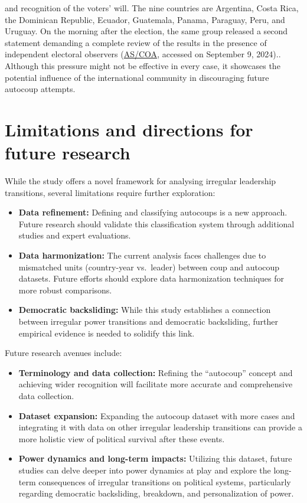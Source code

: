 \documentclass[
  12pt,
]{report}
\begin{document}
\begin{itemize}
{    and recognition of the voters' will. The nine countries are
    Argentina, Costa Rica, the Dominican Republic, Ecuador, Guatemala,
    Panama, Paraguay, Peru, and Uruguay. On the morning after the
    election, the same group released a second statement demanding a
    complete review of the results in the presence of independent
    electoral observers
    (\href{https://www.as-coa.org/articles/how-have-international-leaders-responded-venezuelas-2024-election}{AS/COA},
    accessed on September 9, 2024).}. Although this pressure might not
  be effective in every case, it showcases the potential influence of
  the international community in discouraging future autocoup attempts.
\end{itemize}

\section{Limitations and directions for future
research}\label{limitations-and-directions-for-future-research}

While the study offers a novel framework for analysing irregular
leadership transitions, several limitations require further exploration:

\begin{itemize}
\item
  \textbf{Data refinement:} Defining and classifying autocoups is a new
  approach. Future research should validate this classification system
  through additional studies and expert evaluations.
\item
  \textbf{Data harmonization:} The current analysis faces challenges due
  to mismatched units (country-year vs.~leader) between coup and
  autocoup datasets. Future efforts should explore data harmonization
  techniques for more robust comparisons.
\item
  \textbf{Democratic backsliding:} While this study establishes a
  connection between irregular power transitions and democratic
  backsliding, further empirical evidence is needed to solidify this
  link.
\end{itemize}

Future research avenues include:

\begin{itemize}
\item
  \textbf{Terminology and data collection:} Refining the ``autocoup''
  concept and achieving wider recognition will facilitate more accurate
  and comprehensive data collection.
\item
  \textbf{Dataset expansion:} Expanding the autocoup dataset with more
  cases and integrating it with data on other irregular leadership
  transitions can provide a more holistic view of political survival
  after these events.
\item
  \textbf{Power dynamics and long-term impacts:} Utilizing this dataset,
  future studies can delve deeper into power dynamics at play and
  explore the long-term consequences of irregular transitions on
  political systems, particularly regarding democratic backsliding,
  breakdown, and personalization of power.
\end{itemize}
\end{document}
